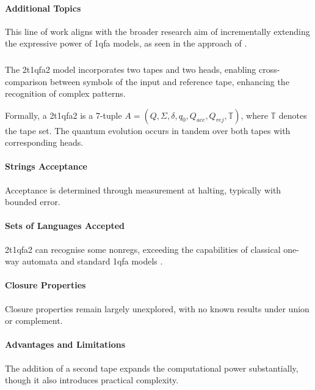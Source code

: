 \paragraph{Additional Topics}
This line of work aligns with the broader research aim of incrementally extending the expressive power of \gls{1qfa} models, as seen in the approach of \cite{ciamarra2001quantum}.

\subsubsection{}
The \gls{2t1qfa2} model incorporates two tapes and two heads, enabling cross-comparison between symbols of the input and reference tape, enhancing the recognition of complex patterns.

\begin{definition}
Formally, a \gls{2t1qfa2} is a 7-tuple \( A = (Q, \Sigma, \delta, q_0, Q_{acc}, Q_{rej}, \mathbb{T}) \), where \( \mathbb{T} \) denotes the tape set. The quantum evolution occurs in tandem over both tapes with corresponding heads.
\end{definition}

\paragraph{Strings Acceptance}
Acceptance is determined through measurement at halting, typically with bounded error.

\paragraph{Sets of Languages Accepted}
\gls{2t1qfa2} can recognise some non\glspl{reg}, exceeding the capabilities of classical one-way automata and standard \gls{1qfa} models \cite{ganguly20162}.

\paragraph{Closure Properties}
Closure properties remain largely unexplored, with no known results under union or complement.

\paragraph{Advantages and Limitations}
The addition of a second tape expands the computational power substantially, though it also introduces practical complexity.

